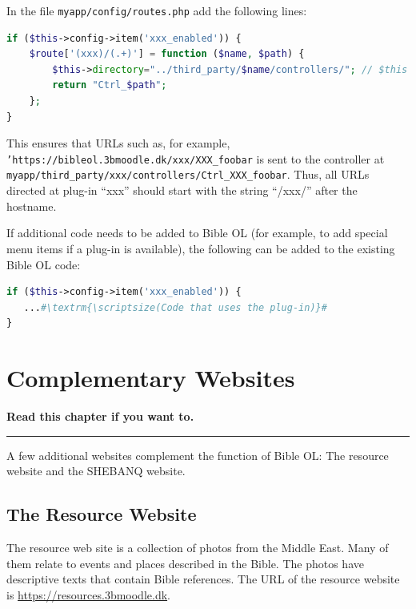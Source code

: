 \documentclass[11pt,oneside,a4paper]{memoir}
\begin{document}
In the file \texttt{myapp/config/routes.php} add the following lines:

\begin{lstlisting}[language=PHP]
if ($this->config->item('xxx_enabled')) {
    $route['(xxx)/(.+)'] = function ($name, $path) {
        $this->directory="../third_party/$name/controllers/"; // $this is the CI_Router object
        return "Ctrl_$path";
    };
}
\end{lstlisting}

This ensures that URLs such as, for example, \texttt{'https://bibleol.3bmoodle.dk/xxx/XXX\_foobar} is
sent to the controller at \texttt{myapp/third\_party/xxx/controllers/Ctrl\_XXX\_foobar}. Thus, all
URLs directed at plug-in ``xxx'' should start with the string ``/xxx/'' after the hostname.

If additional code needs to be added to Bible OL (for example, to add special menu items if a plug-in
is available), the following can be added to the existing Bible OL code:

\begin{lstlisting}[escapechar=\#,language=PHP]
if ($this->config->item('xxx_enabled')) {
   ...#\textrm{\scriptsize(Code that uses the plug-in)}#
}
\end{lstlisting}


\chapter{Complementary Websites}

\textbf{Read this chapter if you want to.}
\plainbreak{3}


A few additional websites complement the function of Bible OL: The resource website and the SHEBANQ
website.



\section{The Resource Website}\label{sec-resource-web}

The resource web site is a collection of photos from the Middle East. Many of them relate to events
and places described in the Bible. The photos have descriptive texts that contain Bible references.
The URL of the resource website is \url{https://resources.3bmoodle.dk}.
\end{document}
